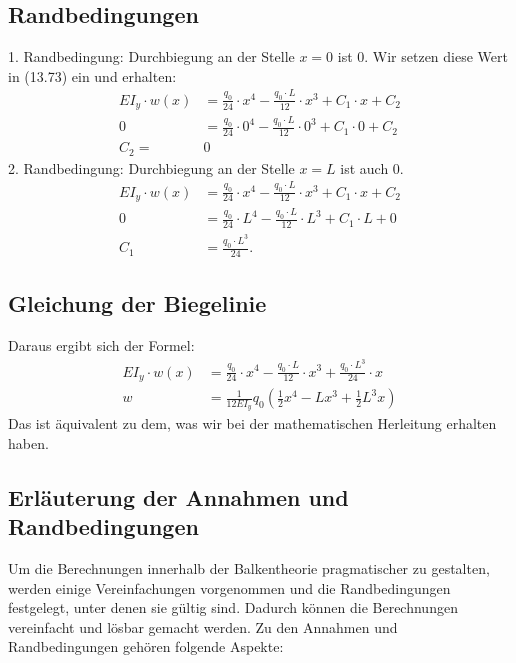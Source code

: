 \subsection{Randbedingungen}
1. Randbedingung: Durchbiegung an der Stelle $x = 0$ ist 0. Wir setzen diese Wert in (13.73) ein und erhalten:
\begin{align}
		EI_y\cdot w\left(x\right)&=
		\frac{q_0}{24}\cdot x^4-\frac{q_0\cdot L}{12}\cdot x^3+C_1\cdot x+C_2
	\\
		0&=
		\frac{q_0}{24}\cdot0^4-\frac{q_0\cdot L}{12}\cdot0^3+C_1\cdot0+C_2
	\\
		C_2=&0
\end{align}
2. Randbedingung: Durchbiegung an der Stelle $x = L$ ist auch 0.
\begin{align}
		EI_y\cdot w\left(x\right)&=
		\frac{q_0}{24}\cdot x^4-\frac{q_0\cdot L}{12}\cdot x^3+C_1\cdot x+C_2
	\\
		0&=
		\frac{q_0}{24}\cdot L^4-\frac{q_0\cdot L}{12}\cdot L^3+C_1\cdot L+0
	\\
		C_1&=
		\frac{q_0\cdot L^3}{24}.
\end{align}

\subsection{Gleichung der Biegelinie}
Daraus ergibt sich der Formel:
\begin{align}
		EI_y\cdot w\left(x\right)&=
		\frac{q_0}{24}\cdot x^4-\frac{q_0\cdot L}{12}\cdot x^3+\frac{q_0\cdot L^3}{24}\cdot x
	\\
		w&=
		\frac{1}{12EI_y}q_0\left(\frac{1}{2}x^4-Lx^3+\frac{1}{2}L^3x\right)
\end{align}
Das ist äquivalent zu dem, was wir bei der mathematischen Herleitung erhalten haben.

\subsection{Erläuterung der Annahmen und Randbedingungen}
Um die Berechnungen innerhalb der Balkentheorie pragmatischer zu gestalten, werden einige Vereinfachungen vorgenommen und die Randbedingungen festgelegt, unter denen sie gültig sind.
Dadurch können die Berechnungen vereinfacht und lösbar gemacht werden. \cite{balken:Differentialgleichung-der-Biegelinie}
Zu den Annahmen und Randbedingungen gehören folgende Aspekte:

